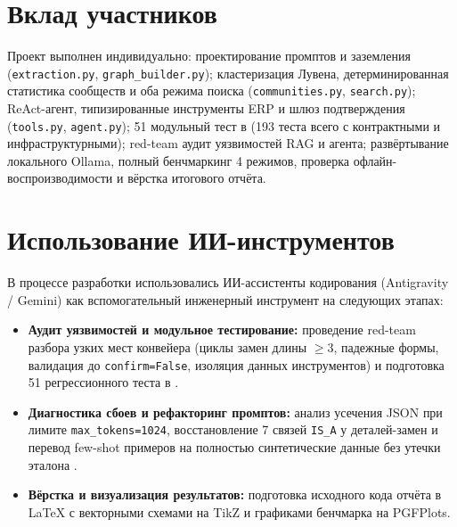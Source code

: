 \documentclass[a4paper,11pt]{article}
\begin{document}
\section{Вклад участников}\label{sec:contrib}

Проект выполнен индивидуально: проектирование промптов и заземления (\texttt{extraction.py}, \texttt{graph\_builder.py}); кластеризация Лувена, детерминированная статистика сообществ и оба режима поиска (\texttt{communities.py}, \texttt{search.py}); ReAct-агент, типизированные инструменты ERP и шлюз подтверждения (\texttt{tools.py}, \texttt{agent.py}); \num{51} модульный тест в  (\num{193} теста всего с контрактными и инфраструктурными); red-team аудит уязвимостей RAG и агента; развёртывание локального Ollama, полный бенчмаркинг \num{4} режимов, проверка офлайн-воспроизводимости и вёрстка итогового отчёта.

\section{Использование ИИ-инструментов}\label{sec:ai}

В процессе разработки использовались ИИ-ассистенты кодирования (Antigravity / Gemini) как вспомогательный инженерный инструмент на следующих этапах:
\begin{itemize}
  \item \textbf{Аудит уязвимостей и модульное тестирование:} проведение red-team разбора узких мест конвейера (циклы замен длины $\ge 3$, падежные формы, валидация до \texttt{confirm=False}, изоляция данных инструментов) и подготовка \num{51} регрессионного теста в .
  \item \textbf{Диагностика сбоев и рефакторинг промптов:} анализ усечения JSON при лимите \texttt{max\_tokens=1024}, восстановление \num{7} связей \texttt{IS\_A} у деталей-замен и перевод few-shot примеров на полностью синтетические данные без утечки эталона .
  \item \textbf{Вёрстка и визуализация результатов:} подготовка исходного кода отчёта в LaTeX с векторными схемами на TikZ и графиками бенчмарка на PGFPlots.
\end{itemize}
\end{document}
